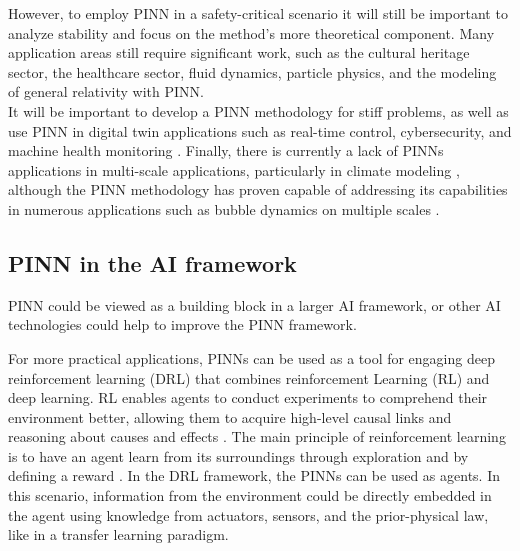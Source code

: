 \documentclass[pdflatex,sn-basic]{sn-jnl}%
\theoremstyle{thmstyleone}%
\theoremstyle{thmstyletwo}%
\theoremstyle{thmstylethree}%
\begin{document}
However, to employ PINN in a safety-critical scenario it will still be important to analyze stability and focus on the method's more theoretical component. 
%
Many application areas still require significant work, such as the cultural heritage sector, the healthcare sector, fluid dynamics, particle physics, and the modeling of general relativity with PINN. 
\noindent
\\
It will be important to develop a PINN methodology for stiff problems, as well as use PINN in digital twin applications such as real-time control, cybersecurity, and machine health monitoring \citep{Nan2021_ProgressTowardsSolving_HenNHN}. 
%
Finally, there is currently a lack of PINNs applications in multi-scale applications, particularly in climate modeling \citep{Irr2021_TowardsNeuralEarth_BoeIBS},
although the PINN methodology has proven capable of addressing its capabilities in numerous applications such as bubble dynamics on multiple scales
\citep{Lin2021_OperatorLearningPredicting_LiLLL, Lin2021_SeamlessMultiscaleOperator_MaxLMLK}.



\subsection{PINN in the AI framework}
PINN could be viewed as a building block in a larger AI framework, or other AI technologies could help to improve the PINN framework. 
\\
\noindent


For more practical applications, PINNs can be used as a tool for engaging deep reinforcement learning (DRL) that combines reinforcement Learning (RL) and deep learning.
RL enables agents to conduct experiments to comprehend their environment better, allowing them to acquire high-level causal links and reasoning about causes and effects
\citep{Aru2017_DeepReinforcementLearning_DeiADBB}.
%
The main principle of reinforcement learning is to have an agent learn from its surroundings through exploration and by defining a reward \citep{Shr2019_ReviewDeepLearning_MahSM}.
%
%
In the DRL framework, the PINNs can be used as agents.
In this scenario, information from the environment could be directly embedded in the agent using knowledge from actuators, sensors, and the prior-physical law,  like in a  transfer learning paradigm.
\\
\noindent
\end{document}
